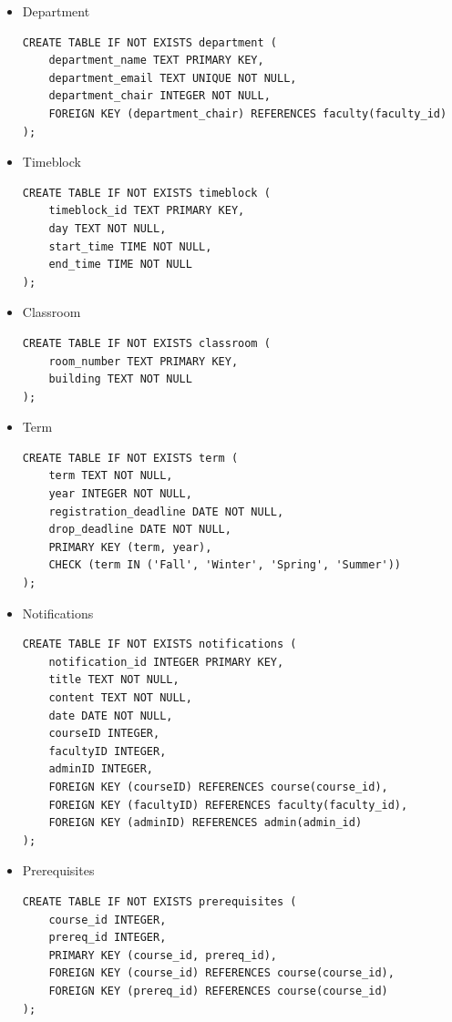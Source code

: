 \documentclass{report}
\begin{document}
\begin{itemize}
    \item Department
    \begin{lstlisting}
CREATE TABLE IF NOT EXISTS department (
    department_name TEXT PRIMARY KEY,
    department_email TEXT UNIQUE NOT NULL,
    department_chair INTEGER NOT NULL,
    FOREIGN KEY (department_chair) REFERENCES faculty(faculty_id)
);
    \end{lstlisting}

    \item Timeblock
    \begin{lstlisting}
CREATE TABLE IF NOT EXISTS timeblock (
    timeblock_id TEXT PRIMARY KEY,
    day TEXT NOT NULL,
    start_time TIME NOT NULL,
    end_time TIME NOT NULL
);
    \end{lstlisting}

    \item Classroom
    \begin{lstlisting}
CREATE TABLE IF NOT EXISTS classroom (
    room_number TEXT PRIMARY KEY,
    building TEXT NOT NULL
);         
    \end{lstlisting}

    \item Term
    \begin{lstlisting}
CREATE TABLE IF NOT EXISTS term (
    term TEXT NOT NULL,
    year INTEGER NOT NULL,
    registration_deadline DATE NOT NULL,
    drop_deadline DATE NOT NULL,
    PRIMARY KEY (term, year),
    CHECK (term IN ('Fall', 'Winter', 'Spring', 'Summer'))
);         
    \end{lstlisting}

    \item Notifications
    \begin{lstlisting}
CREATE TABLE IF NOT EXISTS notifications (
    notification_id INTEGER PRIMARY KEY,
    title TEXT NOT NULL,
    content TEXT NOT NULL,
    date DATE NOT NULL,
    courseID INTEGER,
    facultyID INTEGER,
    adminID INTEGER,
    FOREIGN KEY (courseID) REFERENCES course(course_id),
    FOREIGN KEY (facultyID) REFERENCES faculty(faculty_id),
    FOREIGN KEY (adminID) REFERENCES admin(admin_id)
);
    \end{lstlisting}

    \item Prerequisites
    \begin{lstlisting}
CREATE TABLE IF NOT EXISTS prerequisites (
    course_id INTEGER,
    prereq_id INTEGER,
    PRIMARY KEY (course_id, prereq_id),
    FOREIGN KEY (course_id) REFERENCES course(course_id),
    FOREIGN KEY (prereq_id) REFERENCES course(course_id)
);         
    \end{lstlisting}


\end{itemize}
\end{document}
